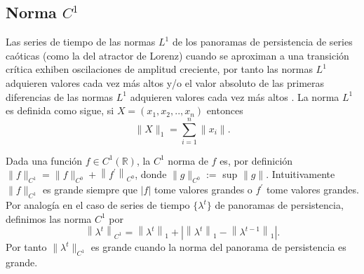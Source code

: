\subsection{Norma $C^1$}
\label{normastopologicas}
Las series de tiempo de las normas $L^1$ de los panoramas de persistencia de series caóticas (como la del atractor de Lorenz) cuando se aproximan a una transición crítica  exhiben oscilaciones de amplitud creciente, por tanto las normas $L^1$ adquieren valores cada vez más altos y/o el valor absoluto de las primeras diferencias de las normas $L^1$ adquieren valores cada vez más altos \parencite{gideaTopologicalRecognitionCritical2020}.
La norma $L^1$ es definida como sigue, si $X = (x_1,x_2,..,x_n)$ entonces
\[ \|X\|_{1} = \sum_{i=1}^{n} \|x_{i}\|. \]


Dada una función $f \in C^1(\mathbb{R})$, la $C^1$ norma de $f$ es, por definición $\|f\|_{C^{1}}=\|f\|_{C^{0}}+\left\|f^{\prime}\right\|_{C^{0}}$, donde $\|g\|_{C^0} :=$ sup $\|g\|$. Intuitivamente $\|f\|_{C^{1}}$ es grande siempre que $|f|$ tome valores grandes o $f^{\prime}$ tome valores grandes. Por analogía en el caso de series de tiempo $\{\lambda^t \}$ de panoramas de persistencia, definimos las norma $C^1$ por 
\[
\left\|\lambda^{t}\right\|_{C^{1}}=\left\|\lambda^{t}\right\|_{1}+\left|\left\|\lambda^{t}\right\|_{1}-\left\|\lambda^{t-1}\right\|_{1}\right|.
\]
Por tanto $\|\lambda^t\|_{C^1}$ es grande cuando la norma del panorama de persistencia es grande.

























